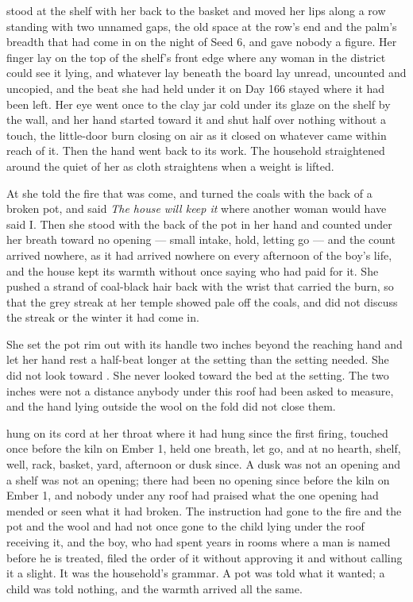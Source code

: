  stood at the shelf with her back to the basket and moved her lips along a row standing with two unnamed gaps, the old space at the row's end and the palm's breadth that had come in on the night of Seed 6, and gave nobody a figure. Her finger lay on the top of the shelf's front edge where any woman in the district could see it lying, and whatever lay beneath the board lay unread, uncounted and uncopied, and the beat she had held under it on Day 166 stayed where it had been left. Her eye went once to the clay jar cold under its glaze on the shelf by the wall, and her hand started toward it and shut half over nothing without a touch, the little-door burn closing on air as it closed on whatever came within reach of it. Then the hand went back to its work. The household straightened around the quiet of her as cloth straightens when a weight is lifted.

At  she told the fire that  was come, and turned the coals with the back of a broken pot, and said \emph{The house will keep it} where another woman would have said I. Then she stood with the back of the pot in her hand and counted under her breath toward no opening --- small intake, hold, letting go --- and the count arrived nowhere, as it had arrived nowhere on every afternoon of the boy's life, and the house kept its warmth without once saying who had paid for it. She pushed a strand of coal-black hair back with the wrist that carried the burn, so that the grey streak at her temple showed pale off the coals, and did not discuss the streak or the winter it had come in.

She set the pot rim out with its handle two inches beyond the reaching hand and let her hand rest a half-beat longer at the setting than the setting needed. She did not look toward . She never looked toward the bed at the setting. The two inches were not a distance anybody under this roof had been asked to measure, and the hand lying outside the wool on the fold did not close them.

 hung on its cord at her throat where it had hung since the first firing, touched once before the kiln on Ember 1, held one breath, let go, and at no hearth, shelf, well, rack, basket, yard, afternoon or dusk since. A dusk was not an opening and a shelf was not an opening; there had been no opening since before the kiln on Ember 1, and nobody under any roof had praised what the one opening had mended or seen what it had broken. The instruction had gone to the fire and the pot and the wool and had not once gone to the child lying under the roof receiving it, and the boy, who had spent years in rooms where a man is named before he is treated, filed the order of it without approving it and without calling it a slight. It was the household's grammar. A pot was told what it wanted; a child was told nothing, and the warmth arrived all the same.

